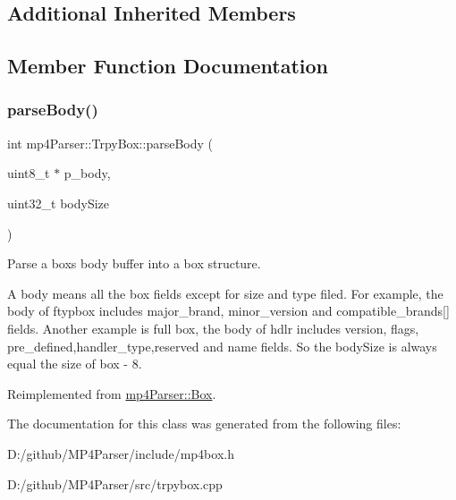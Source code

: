 \subsection*{Additional Inherited Members}


\subsection{Member Function Documentation}
\mbox{\label{classmp4_parser_1_1_trpy_box_a15efae09d81df73b14bb59039452785d}} 
\subsubsection{\texorpdfstring{parseBody()}{parseBody()}}
{\footnotesize\ttfamily int mp4\+Parser\+::\+Trpy\+Box\+::parse\+Body (\begin{DoxyParamCaption}\item[{uint8\+\_\+t $\ast$}]{p\+\_\+body,  }\item[{uint32\+\_\+t}]{body\+Size }\end{DoxyParamCaption})\hspace{0.3cm}{\ttfamily [virtual]}}



Parse a box\textquotesingle{}s body buffer into a box structure. 

A body means all the box fields except for size and type filed. For example, the body of ftypbox includes major\+\_\+brand, minor\+\_\+version and compatible\+\_\+brands\mbox{[}\mbox{]} fields. Another example is full box, the body of hdlr includes version, flags, pre\+\_\+defined,handler\+\_\+type,reserved and name fields. So the body\+Size is always equal the size of box -\/ 8. 

Reimplemented from \mbox{\hyperlink{classmp4_parser_1_1_box_a3dd0c084ac65bc77b69ac5ecaf796cb2}{mp4\+Parser\+::\+Box}}.



The documentation for this class was generated from the following files\+:\begin{DoxyCompactItemize}
\item 
D\+:/github/\+M\+P4\+Parser/include/mp4box.\+h\item 
D\+:/github/\+M\+P4\+Parser/src/trpybox.\+cpp\end{DoxyCompactItemize}
